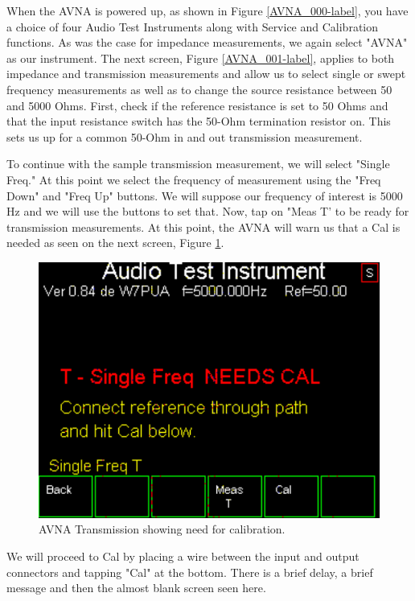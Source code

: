 When the AVNA is powered up, as shown in  Figure \ref{AVNA_000-label},  you have a choice of four Audio Test Instruments along with Service and Calibration functions.  As was the case for impedance measurements, we again select "AVNA" as our instrument.  The next screen, Figure  \ref{AVNA_001-label}, applies to both impedance and transmission measurements and allow us to select single or swept frequency measurements as well as to change the source resistance between 50 and 5000 Ohms.  First, check if the reference resistance is set to 50 Ohms and that the input resistance switch has the 50-Ohm termination resistor on.  This sets us up for a common 50-Ohm in and out transmission measurement.

To continue with the sample transmission measurement, we will select "Single Freq."  At this point we select the frequency of measurement using the "Freq Down" and "Freq Up"  buttons.  We will suppose our frequency of interest is 5000 Hz and we will use the buttons to set that.  Now, tap on "Meas T' to be ready for transmission measurements.   At this point, the AVNA will warn us that a Cal is needed as seen on the next screen, Figure  \ref{AVNA_043-label}.
\begin{figure}[H]
\begin{center}
\includegraphics[scale=0.75]{./images/AVNA_043.pdf}
\caption{AVNA Transmission showing need for calibration.}
\label{AVNA_043-label}
\end{center}
\end{figure}
%
 We will proceed to Cal by placing a wire between the input and output connectors and tapping "Cal" at the bottom.   There is a brief delay, a brief message and then the almost blank screen seen here.
